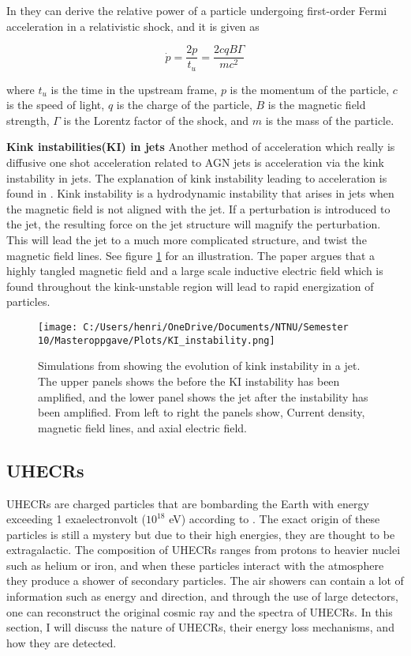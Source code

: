 In \cite{Dermer_2001} they can derive the relative power of a particle undergoing first-order Fermi acceleration in a relativistic shock, and it is given as 



\begin{equation}
    \dot p = \frac{2p}{t_u} = \frac{2cqB\Gamma}{mc^2 }
\end{equation}


where $t_u$ is the time in the upstream frame, $p$ is the momentum of the particle, $c$ is the speed of light, $q$ is the charge of the particle, $B$ is the magnetic field strength, $\Gamma$ is the Lorentz factor of the shock, and $m$ is the mass of the particle.

\textbf{Kink instabilities(KI) in jets}
Another method of acceleration which really is diffusive one shot acceleration related to AGN jets is acceleration via the kink instability in jets. The explanation of kink instability leading to acceleration is found in \cite{Alves_2018}. Kink instability is a hydrodynamic instability that arises in jets when the magnetic field is not aligned with the jet. If a perturbation is introduced to the jet, the resulting force on the jet structure will magnify the perturbation. This will lead the jet to a much more complicated structure, and twist the magnetic field lines. See figure \ref{fig:kink_instability} for an illustration. The paper argues that a highly tangled magnetic field and a large scale inductive electric field which is found throughout the kink-unstable region will lead to rapid energization of particles. 

\begin{figure}
    \centering
    \texttt{[image: C:/Users/henri/OneDrive/Documents/NTNU/Semester 10/Masteroppgave/Plots/KI\_instability.png]}
    \caption{Simulations from \cite{Alves_2018} showing the evolution of kink instability in a jet. The upper panels shows the before the KI instability has been amplified, and the lower panel shows the jet after the instability has been amplified. From left to right the panels show, Current density, magnetic field lines, and axial electric field. }
    \label{fig:kink_instability}
\end{figure}

\subsection{UHECRs}

UHECRs are charged particles that are bombarding the Earth with energy exceeding 1 exaelectronvolt ($10^{18}$ eV) according to \cite{Alves_Batista_2019}. The exact origin of 
these particles is still a mystery but due to their high energies, they are thought to be extragalactic.
The composition of UHECRs ranges from protons to heavier nuclei such as helium or iron, and when these particles interact with the atmosphere they produce a shower of secondary particles.
The air showers can contain a lot of information such as energy and  direction, and through the use of large detectors, one can reconstruct the original cosmic ray and the spectra of UHECRs. In this section, I will discuss the nature of UHECRs, their energy loss mechanisms, and how they are detected.


